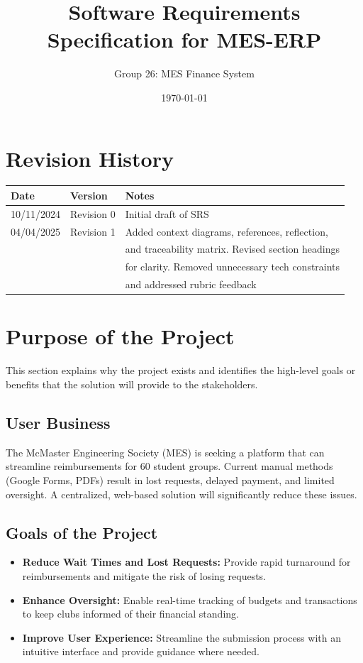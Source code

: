 \documentclass[12pt]{article}
\title{Software Requirements Specification for MES-ERP}
\author{Group 26: MES Finance System}
\date{\today}
\begin{document}
\maketitle


\tableofcontents

\newpage

\section*{Revision History}
\begin{tabularx}{\textwidth}{p{3cm}p{2cm}X}
  \toprule
  \textbf{Date} & \textbf{Version} & \textbf{Notes} \\
  \midrule
  10/11/2024 & Revision 0 & Initial draft of SRS \\
  04/04/2025 & Revision 1 & 
    Added context diagrams, references, reflection, \\
    & & and traceability matrix. Revised section headings \\
    & & for clarity. Removed unnecessary tech constraints \\
    & & and addressed rubric feedback \\
  \bottomrule
\end{tabularx}

\newpage
{}

\section{Purpose of the Project}
This section explains why the project exists and identifies the high-level goals or benefits that the solution will provide to the stakeholders.

\subsection{User Business}
The McMaster Engineering Society (MES) is seeking a platform that can streamline reimbursements for 60 student groups. Current manual methods (Google Forms, PDFs) result in lost requests, delayed payment, and limited oversight. A centralized, web-based solution will significantly reduce these issues.

\subsection{Goals of the Project}
\begin{itemize}
    \item \textbf{Reduce Wait Times and Lost Requests:} Provide rapid turnaround for reimbursements and mitigate the risk of losing requests.
    \item \textbf{Enhance Oversight:} Enable real-time tracking of budgets and transactions to keep clubs informed of their financial standing.
    \item \textbf{Improve User Experience:} Streamline the submission process with an intuitive interface and provide guidance where needed.
\end{itemize}
\end{document}
